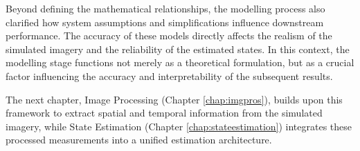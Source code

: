 \noindent
Beyond defining the mathematical relationships, the modelling process also clarified how system assumptions and simplifications influence downstream performance. The accuracy of these models directly affects the realism of the simulated imagery and the reliability of the estimated states. In this context, the modelling stage functions not merely as a theoretical formulation, but as a crucial factor influencing the accuracy and interpretability of the subsequent results.
\vspace{0.5cm}

\noindent
The next chapter, Image Processing (Chapter \ref{chap:imgpros}), builds upon this framework to extract spatial and temporal information from the simulated imagery, while State Estimation (Chapter \ref{chap:stateestimation}) integrates these processed measurements into a unified estimation architecture. 

